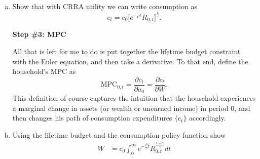 \documentclass[11pt]{extarticle}
\theoremstyle{plain}
\theoremstyle{definition}
\begin{document}
\begin{enumerate}[(a)]
\item Show that with CRRA utility we can write consumption as 
\begin{equation*}
	c_t = c_0 \bigg[ e^{- \rho t} R_{0,t} \bigg]^\frac{1}{\gamma} .
\end{equation*}






\vspace{5mm}
\noindent
\textbf{Step \#3: MPC}



\vspace{3mm}
\noindent
All that is left for me to do is put together the lifetime budget constraint with the Euler equation, and then take a derivative. To that end, define the household's MPC as 
\begin{equation*}
	\text{MPC}_{0,t} = \frac{\partial c_t}{\partial a_0} = \frac{\partial c_t}{\partial W}.
\end{equation*}
This definition of course captures the intuition that the household experiences a marginal change in assets (or wealth or unearned income) in period $0$, and then changes his path of consumption expenditures $\{ c_t\}$ accordingly. 

\item Using the lifetime budget and the consumption policy function show
\begin{align*}
	W &= c_0 \int_0^\infty e^{- \frac{\rho}{\gamma} t} R_{0,t}^\frac{1-\gamma}{\gamma} dt \\
\end{align*}



\end{enumerate}
\end{document}
